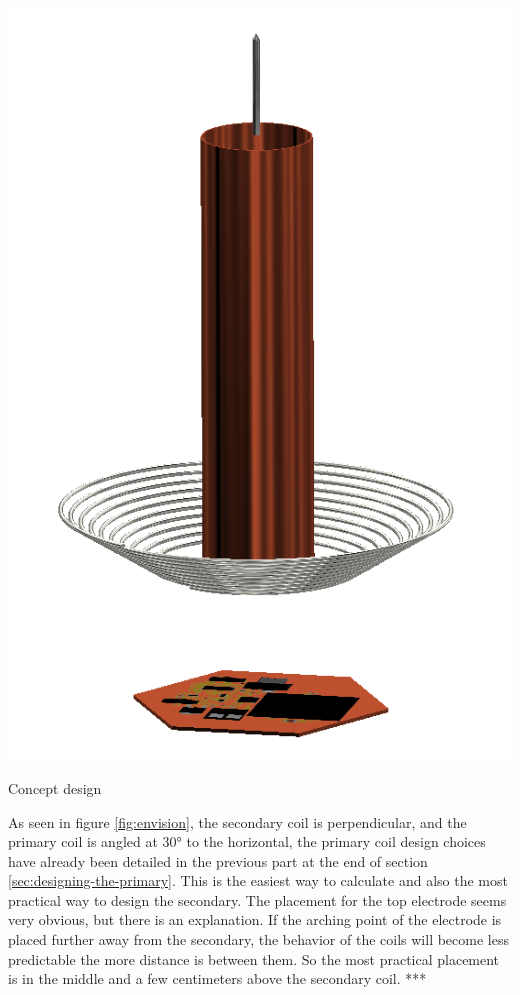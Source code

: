 \begin{marginfigure}[1cm]
    \centering
    \includegraphics[width=1.2\textwidth]{kassandra/resources/JerJerWoBistDuKonzept.PNG}
    \caption{Concept design}
    \label{fig:envision}
\end{marginfigure}

As seen in figure \ref{fig:envision}, the secondary coil is perpendicular, and the primary coil is angled at 30° to the horizontal, the primary coil design choices have already been detailed in the previous part at the end of section \ref{sec:designing-the-primary}. This is the easiest way to calculate and also the most practical way to design the secondary. The placement for the top electrode seems very obvious, but there is an explanation. If the arching point of the electrode is placed further away from the secondary, the behavior of the coils will become less predictable the more distance is between them. So the most practical placement is in the middle and a few centimeters above the secondary coil. ***

